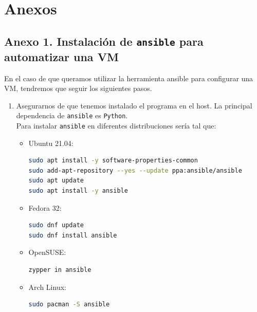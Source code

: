 \documentclass[12pt]{article}
\begin{document}
	\pagebreak
	
	\section{Anexos}
	
	\subsection*{Anexo 1. Instalación de \texttt{ansible} para automatizar una VM}
	\noindent En el caso de que queramos utilizar la herramienta ansible para configurar una VM, tendremos que seguir los siguientes pasos.
	\begin{enumerate}
		\item Asegurarnos de que tenemos instalado el programa en el host. La principal dependencia de \texttt{ansible} es \texttt{Python}. \\
		Para instalar \texttt{ansible} en diferentes distribuciones sería tal que:
		\begin{itemize}
			\item Ubuntu 21.04:
			\begin{lstlisting}[language=Bash, caption={Instalación \texttt{ansible} en Ubuntu}]
sudo apt install -y software-properties-common
sudo add-apt-repository --yes --update ppa:ansible/ansible
sudo apt update
sudo apt install -y ansible
			\end{lstlisting}
			
			\item Fedora 32:
			\begin{lstlisting}[language=Bash, caption={Instalación \texttt{ansible} en Fedora}]
sudo dnf update
sudo dnf install ansible
			\end{lstlisting}
			
			\item OpenSUSE:
			\begin{lstlisting}[language=Bash, caption={Instalación \texttt{ansible} en OpenSUSE}]
zypper in ansible
			\end{lstlisting}
			
			\item Arch Linux:
			\begin{lstlisting}[language=Bash, caption={Instalación \texttt{ansible} en Arch Linux}]
sudo pacman -S ansible
			\end{lstlisting} 
		\end{itemize}
		

\end{enumerate}
\end{document}
